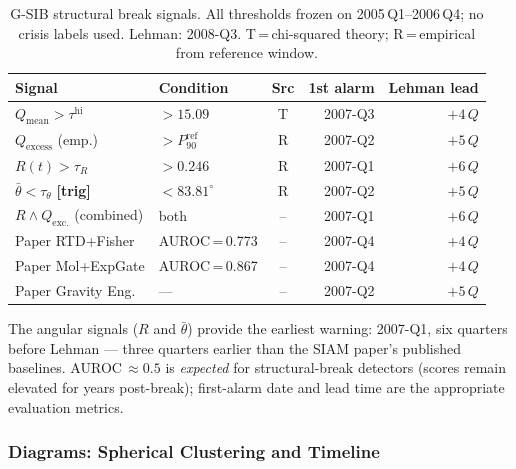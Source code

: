 \documentclass[11pt,a4paper]{article}
\begin{document}
\begin{table}[H]
\centering
\caption{G-SIB structural break signals.  All thresholds frozen on
  2005\,Q1--2006\,Q4; no crisis labels used.  Lehman: 2008-Q3.
  T\,=\,chi-squared theory; R\,=\,empirical from reference window.}
\label{tab:gsib_alarms}
\small
\renewcommand{\arraystretch}{1.13}
\begin{tabular}{@{}llcrr@{}}
\toprule
\textbf{Signal} & \textbf{Condition} & \textbf{Src}
  & \textbf{1st alarm} & \textbf{Lehman lead} \\
\midrule
$Q_{\mathrm{mean}} > \tau^{\mathrm{hi}}$   & $>15.09$        & T  & 2007-Q3 & $+4\,Q$ \\
$Q_{\mathrm{excess}}$ (emp.)               & $>P_{90}^{\mathrm{ref}}$ & R & 2007-Q2 & $+5\,Q$ \\
$R(t) > \tau_R$                            & $>0.246$        & R  & 2007-Q1 & $+6\,Q$ \\
$\bar\theta < \tau_\theta$ \textbf{[trig]} & $<83.81^\circ$  & R  & 2007-Q2 & $+5\,Q$ \\
$R \wedge Q_{\mathrm{exc.}}$ (combined)    & both            & -- & 2007-Q1 & $+6\,Q$ \\
\midrule
Paper RTD+Fisher    & AUROC\,=\,0.773 & -- & 2007-Q4 & $+4\,Q$ \\
Paper Mol+ExpGate   & AUROC\,=\,0.867 & -- & 2007-Q4 & $+4\,Q$ \\
Paper Gravity Eng.  & ---             & -- & 2007-Q2 & $+5\,Q$ \\
\bottomrule
\end{tabular}
\end{table}

The angular signals ($R$ and $\bar\theta$) provide the earliest warning:
2007-Q1, six quarters before Lehman --- three quarters earlier than the
SIAM paper's published baselines.  AUROC\,$\approx 0.5$ is
\emph{expected} for structural-break detectors (scores remain elevated
for years post-break); first-alarm date and lead time are the appropriate
evaluation metrics.

\subsubsection{Diagrams: Spherical Clustering and Timeline}
\end{document}
